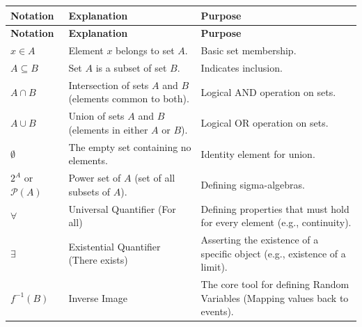 \begin{longtable}{ | L{0.15\textwidth} | L{0.45\textwidth} | L{0.25\textwidth} | }
    \hline
    \textbf{Notation} & \textbf{Explanation} & \textbf{Purpose} \\
    \hline
    \endfirsthead
    
    \hline
    \textbf{Notation} & \textbf{Explanation} & \textbf{Purpose} \\
    \hline
    \endhead

    \hline
    \endfoot

    \hline
    \endlastfoot

    $x \in A$ 
    & Element $x$ belongs to set $A$.
    & Basic set membership. \\
    \hline

    $A \subseteq B$
    & Set $A$ is a subset of set $B$.
    & Indicates inclusion. \\
    \hline

    $A \cap B$
    & Intersection of sets $A$ and $B$ (elements common to both).
    & Logical AND operation on sets. \\
    \hline

    $A \cup B$
    & Union of sets $A$ and $B$ (elements in either $A$ or $B$).
    & Logical OR operation on sets. \\
    \hline

    $\emptyset$
    & The empty set containing no elements.
    & Identity element for union. \\
    \hline

    $2^A$ or $\mathcal{P}(A)$
    & Power set of $A$ (set of all subsets of $A$).
    & Defining sigma-algebras. \\
    \hline
    
    $\forall$ 
    & Universal Quantifier (For all) 
    & Defining properties that must hold for every element (e.g., continuity). \\ \hline

    $\exists$ 
    & Existential Quantifier (There exists) 
    & Asserting the existence of a specific object (e.g., existence of a limit). \\ \hline

    $f^{-1}(B)$ 
    & Inverse Image 
    & The core tool for defining Random Variables (Mapping values back to events). \\ \hline

\end{longtable}
